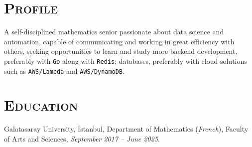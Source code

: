 \documentclass[oneside, 11pt]{memoir}
\begin{document}
\pagestyle{empty}
\section*{\textsc{Profile}}
\noindent
A self-disciplined mathematics senior passionate about data science and
automation, capable of communicating and working in great efficiency with
others, seeking opportunities to learn and study more backend
development, preferably with \texttt{Go} along with \texttt{Redis};
databases, preferably with cloud solutions such as \texttt{AWS/Lambda}
and \texttt{AWS/DynamoDB}.
\section*{\textsc{Education}}
\noindent
Galatasaray University, Istanbul, Department of Mathematics
(\textit{French}), Faculty of
Arts and Sciences, \textit{September 2017 -- June 2025}.
%
\end{document}
